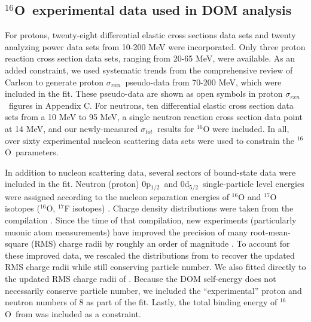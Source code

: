 \documentclass[twocolumn,secnumarabic,amssymb, nobibnotes, aps, prl,
superscriptaddress, nobalancelastpage]{revtex4}
\newcommand{\tot}{\ensuremath{\sigma_{tot}}}
\newcommand{\rxn}{\ensuremath{\sigma_{rxn}}}
\newcommand{\oSix}{\ensuremath{^{16}}O}
\newcommand{\pOne}{p\ensuremath{_{1/2}}}
\newcommand{\dFive}{d\ensuremath{_{5/2}}}
\begin{document}
\subsection{\oSix\ experimental data used in DOM analysis}
For protons, twenty-eight differential elastic cross
sections data sets and twenty analyzing power data sets from 10-200 MeV were
incorporated. Only three proton reaction cross section data sets, ranging from 20-65 MeV,
were available. As an added constraint, we used systematic trends
from the comprehensive review of Carlson \cite{Carlson1975} to generate proton
\rxn\ pseudo-data from 70-200 MeV, which were included in the fit.
These pseudo-data are shown as open symbols in proton \rxn\ figures in
Appendix C.
For neutrons, ten differential elastic cross section
data sets from a 10 MeV to 95 MeV, a single
neutron reaction cross section data point at 14 MeV, and our newly-measured \tot\ results
for $^{16}$O were included. In all, over sixty experimental nucleon scattering
data sets were used to constrain the \oSix\ parameters.

In addition to nucleon scattering data, several sectors of bound-state data were
included in the fit. Neutron (proton) 0\pOne\ and 0\dFive\
single-particle level energies were
assigned according to the nucleon separation energies of $^{16}$O and
$^{17}$O isotopes ($^{16}$O, $^{17}$F isotopes) \cite{AME2016}.
Charge density distributions were taken from the compilation \cite{DeVries1987}.
Since the time of that compilation,
new experiments (particularly muonic atom measurements) have improved the precision
of many root-mean-square (RMS) charge radii by roughly an order of magnitude \cite{Angeli2013}.
To account for these improved data, we rescaled the distributions from
\cite{DeVries1987} to recover the updated
RMS charge radii while still conserving particle number. We also fitted directly
to the updated RMS charge radii of \cite{Angeli2013}.
Because the DOM self-energy does not necessarily conserve particle number, we
included the ``experimental'' proton and neutron numbers of 8 as part of the
fit. Lastly, the total binding energy of \oSix\ from \cite{AME2016} was
included as a constraint. 
\end{document}
